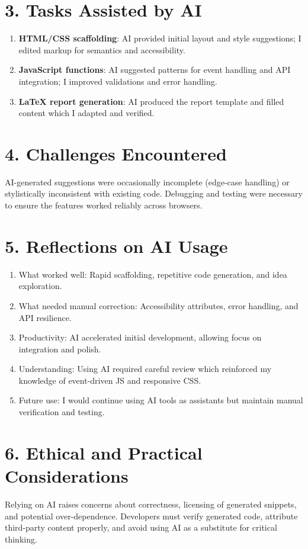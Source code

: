 \documentclass[11pt,a4paper]{article}
\begin{document}
\section*{3. Tasks Assisted by AI}
\begin{enumerate}
  \item \textbf{HTML/CSS scaffolding}: AI provided initial layout and style suggestions; I edited markup for semantics and accessibility.
  \item \textbf{JavaScript functions}: AI suggested patterns for event handling and API integration; I improved validations and error handling.
  \item \textbf{LaTeX report generation}: AI produced the report template and filled content which I adapted and verified.
\end{enumerate}

\section*{4. Challenges Encountered}
AI-generated suggestions were occasionally incomplete (edge-case handling) or stylistically inconsistent with existing code. Debugging and testing were necessary to ensure the features worked reliably across browsers.

\section*{5. Reflections on AI Usage}
\begin{enumerate}
  \item What worked well: Rapid scaffolding, repetitive code generation, and idea exploration.
  \item What needed manual correction: Accessibility attributes, error handling, and API resilience.
  \item Productivity: AI accelerated initial development, allowing focus on integration and polish.
  \item Understanding: Using AI required careful review which reinforced my knowledge of event-driven JS and responsive CSS.
  \item Future use: I would continue using AI tools as assistants but maintain manual verification and testing.
\end{enumerate}

\section*{6. Ethical and Practical Considerations}
Relying on AI raises concerns about correctness, licensing of generated snippets, and potential over-dependence. Developers must verify generated code, attribute third-party content properly, and avoid using AI as a substitute for critical thinking.
\end{document}

